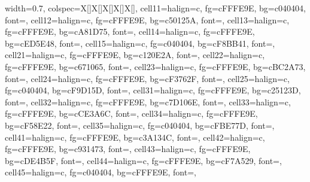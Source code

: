 \begin{table}
\centering
\begin{tblr}[         %
]                     %
{                     %
width={0.7\linewidth},
colspec={X[]X[]X[]X[]X[]},
cell{1}{1}={}{halign=c, fg=cFFFE9E, bg=c040404, font=\fontsize{0.1em}{0.4em}\selectfont},
cell{1}{2}={}{halign=c, fg=cFFFE9E, bg=c50125A, font=\fontsize{0.5em}{0.8em}\selectfont},
cell{1}{3}={}{halign=c, fg=cFFFE9E, bg=cA81D75, font=\fontsize{0.9em}{1.2em}\selectfont},
cell{1}{4}={}{halign=c, fg=cFFFE9E, bg=cED5E48, font=\fontsize{1.3em}{1.6em}\selectfont},
cell{1}{5}={}{halign=c, fg=c040404, bg=cF8BB41, font=\fontsize{1.7em}{2em}\selectfont},
cell{2}{1}={}{halign=c, fg=cFFFE9E, bg=c120E2A, font=\fontsize{0.2em}{0.5em}\selectfont},
cell{2}{2}={}{halign=c, fg=cFFFE9E, bg=c671065, font=\fontsize{0.6em}{0.9em}\selectfont},
cell{2}{3}={}{halign=c, fg=cFFFE9E, bg=cBC2A73, font=\fontsize{1em}{1.3em}\selectfont},
cell{2}{4}={}{halign=c, fg=cFFFE9E, bg=cF3762F, font=\fontsize{1.4em}{1.7em}\selectfont},
cell{2}{5}={}{halign=c, fg=c040404, bg=cF9D15D, font=\fontsize{1.8em}{2.1em}\selectfont},
cell{3}{1}={}{halign=c, fg=cFFFE9E, bg=c25123D, font=\fontsize{0.3em}{0.6em}\selectfont},
cell{3}{2}={}{halign=c, fg=cFFFE9E, bg=c7D106E, font=\fontsize{0.7em}{1em}\selectfont},
cell{3}{3}={}{halign=c, fg=cFFFE9E, bg=cCE3A6C, font=\fontsize{1.1em}{1.4em}\selectfont},
cell{3}{4}={}{halign=c, fg=cFFFE9E, bg=cF58E22, font=\fontsize{1.5em}{1.8em}\selectfont},
cell{3}{5}={}{halign=c, fg=c040404, bg=cFBE77D, font=\fontsize{1.9em}{2.2em}\selectfont},
cell{4}{1}={}{halign=c, fg=cFFFE9E, bg=c3A134C, font=\fontsize{0.4em}{0.7em}\selectfont},
cell{4}{2}={}{halign=c, fg=cFFFE9E, bg=c931473, font=\fontsize{0.8em}{1.1em}\selectfont},
cell{4}{3}={}{halign=c, fg=cFFFE9E, bg=cDE4B5F, font=\fontsize{1.2em}{1.5em}\selectfont},
cell{4}{4}={}{halign=c, fg=cFFFE9E, bg=cF7A529, font=\fontsize{1.6em}{1.9em}\selectfont},
cell{4}{5}={}{halign=c, fg=c040404, bg=cFFFE9E, font=\fontsize{2em}{2.3em}\selectfont},
}                     %

\end{tblr}
\end{table}
